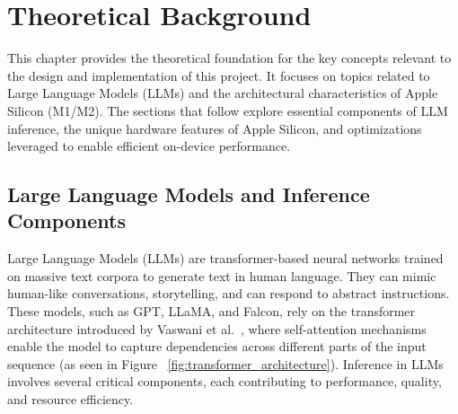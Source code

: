 
\chapter {Theoretical Background}
\label{ch:TheoreticalBackground}

This chapter provides the theoretical foundation for the key concepts relevant to the design and implementation of this project. It focuses on topics related to Large Language Models (LLMs) and the architectural characteristics of Apple Silicon (M1/M2). The sections that follow explore essential components of LLM inference, the unique hardware features of Apple Silicon, and optimizations leveraged to enable efficient on-device performance.

\section{Large Language Models and Inference Components}
\label{sec:LargeLanguageModelsAndInferenceComponents} 

Large Language Models (LLMs) are transformer-based neural networks trained on massive text corpora to generate text in human language. They can mimic human-like conversations, storytelling, and can respond to abstract instructions. These models, such as GPT, LLaMA, and Falcon, rely on the transformer architecture introduced by Vaswani et al.~\cite{vaswani2017attention}, where self-attention mechanisms enable the model to capture dependencies across different parts of the input sequence (as seen in Figure ~\ref{fig:transformer_architecture}). Inference in LLMs involves several critical components, each contributing to performance, quality, and resource efficiency.

